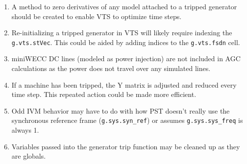 \begin{enumerate}
	\item A method to zero derivatives of any model attached to a tripped generator should be created to enable VTS to optimize time steps.
	\item Re-initializing a tripped generator in VTS will likely require indexing the \verb|g.vts.stVec|. This could be aided by adding indices to the \verb|g.vts.fsdn| cell.
	\item miniWECC DC lines (modeled as power injection) are not included in AGC calculations as the power does not travel over any simulated lines.
	\item If a machine has been tripped, the Y matrix is adjusted and reduced every time step. This repeated action could be made more efficient.
	\item Odd IVM behavior may have to do with how PST doesn't really use the synchronous reference frame (\verb|g.sys.syn_ref|) or assumes \verb|g.sys.sys_freq| is always 1.
	\item Variables passed into the generator trip function may be cleaned up as they are globals.
\end{enumerate}
